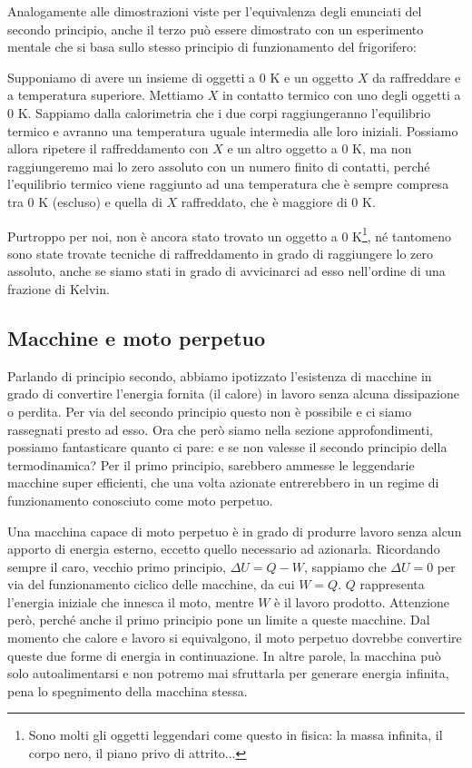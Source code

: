 \noindent Analogamente alle dimostrazioni viste per l'equivalenza
degli enunciati del secondo principio, anche il terzo può essere
dimostrato con un esperimento mentale che si basa sullo stesso principio
di funzionamento del frigorifero:

Supponiamo di avere un insieme di oggetti a 0 K e un oggetto $X$ da
raffreddare e a temperatura superiore. Mettiamo $X$ in
contatto termico con uno degli oggetti a 0 K. Sappiamo dalla calorimetria
che i due corpi raggiungeranno l'equilibrio termico e avranno una
temperatura uguale intermedia alle loro iniziali. Possiamo allora
ripetere il raffreddamento con $X$ e un altro oggetto a 0 K, ma
non raggiungeremo mai lo zero assoluto con un numero finito di
contatti, perché l'equilibrio termico viene raggiunto ad una temperatura
che è sempre compresa tra 0 K (escluso) e quella di $X$ raffreddato, che
è maggiore di 0 K.

Purtroppo per noi, non è ancora stato trovato un oggetto a 0 K\footnote{Sono
molti gli oggetti leggendari come questo in fisica: la massa infinita, il
corpo nero, il piano privo di attrito...}, né tantomeno sono state
trovate tecniche di raffreddamento in grado di raggiungere lo zero
assoluto, anche se siamo stati in grado di avvicinarci ad esso
nell'ordine di una frazione di Kelvin.


\subsection{Macchine e moto perpetuo}
Parlando di principio secondo, abbiamo ipotizzato l'esistenza di macchine
in grado di convertire l'energia fornita (il calore) in lavoro senza alcuna
dissipazione o perdita. Per via del secondo principio questo non è possibile
e ci siamo rassegnati presto ad esso. Ora che però siamo nella sezione approfondimenti,
possiamo fantasticare quanto ci pare: e se non valesse il secondo principio
della termodinamica? Per il primo principio, sarebbero ammesse le leggendarie
macchine super efficienti, che una volta azionate entrerebbero in un regime
di funzionamento conosciuto come moto perpetuo.

Una macchina capace di moto
perpetuo è in grado di produrre lavoro senza alcun apporto di energia esterno,
eccetto quello necessario ad azionarla. Ricordando sempre il caro, vecchio primo
principio, $\Delta U = Q - W$, sappiamo che $\Delta U = 0$ per via del
funzionamento ciclico delle macchine, da cui $W = Q$. $Q$ rappresenta l'energia
iniziale che innesca il moto, mentre $W$ è il lavoro prodotto. Attenzione però,
perché anche il primo principio pone un limite a queste macchine.
Dal momento che calore e lavoro si equivalgono, il moto perpetuo dovrebbe
convertire queste due forme di energia in continuazione. In altre parole,
la macchina può solo autoalimentarsi e non potremo mai sfruttarla per generare
energia infinita, pena lo spegnimento della macchina stessa.

